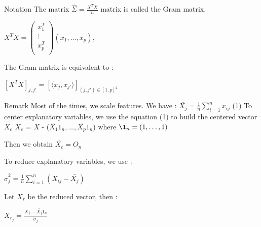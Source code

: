 \documentclass[unknownkeysallowed]{beamer}
\begin{document}
\begin{block}{Notation}
The matrix $\hat\Sigma=\frac{X^TX}{n}$ matrix is called the Gram matrix.
\begin{center}
    $X^TX=\begin{pmatrix}
   x_{1}^T  \\
   \vdots   \\
   x_{p}^T  \\
\end{pmatrix}(x_{1},\dots, x_{p}) $,
\end{center}
\end{block}

The Gram matrix is equivalent to :
\begin{center}
$[X^TX]_{j,j'}=[\langle x_{j},x_{j'}\rangle]_{(j,j')\in[1,p]^2}$  
\end{center}

\begin{block}{Remark}
Most of the times, we scale features.
\newline
We have : $\bar{X_{j}}=\frac{1}{n} \sum\limits_{i=1}^{n} x_{ij}$ (1)
\newline
 To center explanatory variables, we use the equation (1) to build the centered vector $X_{c}$
\newline
$X_{c}$ =  $X$ - ($\bar{X_{1}}1_n,\dots,\bar{X_{p}}1_n$) where $\1_n=(1,\dots,1)$

Then we obtain $\bar{X_{c}}=O_n$

To reduce explanatory variables, we use :
\newline
\begin{center}
$\hat\sigma_{j}^2=\frac{1}{n} \sum\limits_{i=1}^{n} (X_{ij}-\bar{X_{j}})$
\end{center}
Let $X_r$ be the reduced vector, then :
\newline
\begin{center}
$X_{r_{j}}=\frac{X_{j}-\bar{X_{j}}1_n}{\hat\sigma_{j}}$    
\end{center}

\end{block}
\end{document}
